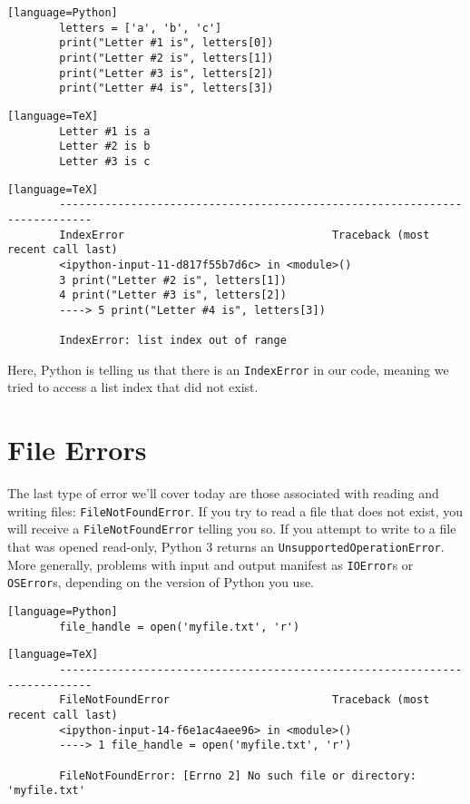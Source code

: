 \documentclass{article}
\begin{document}
	\begin{verbatim}[language=Python]
		letters = ['a', 'b', 'c']
		print("Letter #1 is", letters[0])
		print("Letter #2 is", letters[1])
		print("Letter #3 is", letters[2])
		print("Letter #4 is", letters[3])
	\end{verbatim}
	
	\begin{verbatim}[language=TeX]
		Letter #1 is a
		Letter #2 is b
		Letter #3 is c
	\end{verbatim}
	
	\begin{verbatim}[language=TeX]
		---------------------------------------------------------------------------
		IndexError                                Traceback (most recent call last)
		<ipython-input-11-d817f55b7d6c> in <module>()
		3 print("Letter #2 is", letters[1])
		4 print("Letter #3 is", letters[2])
		----> 5 print("Letter #4 is", letters[3])
		
		IndexError: list index out of range
	\end{verbatim}
	
	Here, Python is telling us that there is an \texttt{IndexError} in our code, meaning we tried to access a list index that did not exist.
	
	\section{File Errors}
	
	The last type of error we'll cover today are those associated with reading and writing files: \texttt{FileNotFoundError}. If you try to read a file that does not exist, you will receive a \texttt{FileNotFoundError} telling you so. If you attempt to write to a file that was opened read-only, Python 3 returns an \texttt{UnsupportedOperationError}. More generally, problems with input and output manifest as \texttt{IOError}s or \texttt{OSError}s, depending on the version of Python you use.
	
	\begin{verbatim}[language=Python]
		file_handle = open('myfile.txt', 'r')
	\end{verbatim}
	
	\begin{verbatim}[language=TeX]
		---------------------------------------------------------------------------
		FileNotFoundError                         Traceback (most recent call last)
		<ipython-input-14-f6e1ac4aee96> in <module>()
		----> 1 file_handle = open('myfile.txt', 'r')
		
		FileNotFoundError: [Errno 2] No such file or directory: 'myfile.txt'
	\end{verbatim}
	
\end{document}
